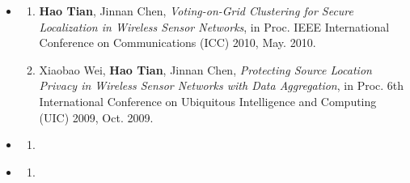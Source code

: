 \begin{achievements}
\begin{itemize}
	 \setlength{\parsep}{2em}
	\item \textbf{\heiti{}}
	      \begin{enumerate}
	      	\setlength{\itemsep}{-\itemsep}  %
	      	
	      	      
  	     \item \textbf{Hao Tian}, Jinnan Chen, \emph{Voting-on-Grid Clustering for Secure Localization in Wireless Sensor Networks}, in Proc. IEEE International Conference on Communications (ICC) 2010, May. 2010.
        \item Xiaobao Wei, \textbf{Hao Tian}, Jinnan Chen, \emph{Protecting Source Location Privacy in Wireless Sensor Networks with Data Aggregation}, in Proc. 6th International Conference on Ubiquitous Intelligence and Computing (UIC) 2009, Oct. 2009.
	      	      
	      \end{enumerate}
	      
 		\item \textbf{\heiti{}}
	      \begin{enumerate}
	      	\item 
	      \end{enumerate}
	      
		\item \textbf{\heiti{}}
	      \begin{enumerate}
	      	\item 
	      \end{enumerate}
	      

	      
\end{itemize}
\end{achievements}
